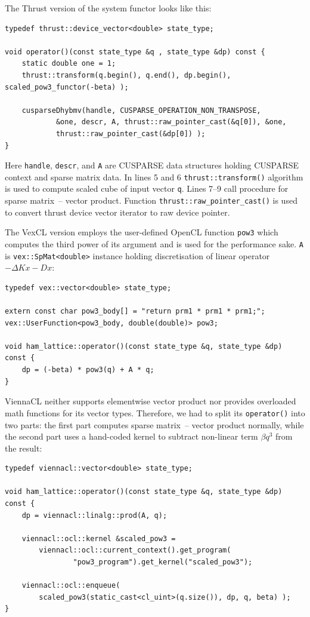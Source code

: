 \documentclass[1p]{elsarticle}
\newcommand{\code}[1]{\lstinline|#1|}
\begin{document}
The Thrust version of the system functor looks like this:
\begin{lstlisting}
typedef thrust::device_vector<double> state_type;

void operator()(const state_type &q , state_type &dp) const {
    static double one = 1;
    thrust::transform(q.begin(), q.end(), dp.begin(), scaled_pow3_functor(-beta) );

    cusparseDhybmv(handle, CUSPARSE_OPERATION_NON_TRANSPOSE,
            &one, descr, A, thrust::raw_pointer_cast(&q[0]), &one,
            thrust::raw_pointer_cast(&dp[0]) );
}
\end{lstlisting}
Here \code{handle}, \code{descr}, and \code{A} are CUSPARSE data structures
holding CUSPARSE context and sparse matrix data. In lines 5 and 6
\code{thrust::transform()} algorithm is used to compute scaled cube of input
vector \code{q}. Lines 7--9 call procedure for sparse matrix~-- vector product.
Function \code{thrust::raw_pointer_cast()} is used to convert thrust device
vector iterator to raw device pointer.

The VexCL version employs the user-defined OpenCL function \code{pow3} which
computes the third power of its argument and is used for the performance sake.
\code{A} is \code{vex::SpMat<double>} instance holding discretisation of linear
operator $-\Delta Kx - Dx$:
\begin{lstlisting}
typedef vex::vector<double> state_type;

extern const char pow3_body[] = "return prm1 * prm1 * prm1;";
vex::UserFunction<pow3_body, double(double)> pow3;

void ham_lattice::operator()(const state_type &q, state_type &dp) const {
    dp = (-beta) * pow3(q) + A * q;
}
\end{lstlisting}

ViennaCL neither supports elementwise vector product nor provides
overloaded math functions for its vector types. Therefore, we had to split its
\code{operator()} into two parts: the first part computes sparse matrix~--
vector product normally, while the second part uses a hand-coded kernel to
subtract non-linear term $\beta q^3$ from the result:
\begin{lstlisting}
typedef viennacl::vector<double> state_type;

void ham_lattice::operator()(const state_type &q, state_type &dp) const {
    dp = viennacl::linalg::prod(A, q);

    viennacl::ocl::kernel &scaled_pow3 =
        viennacl::ocl::current_context().get_program(
                "pow3_program").get_kernel("scaled_pow3");

    viennacl::ocl::enqueue(
        scaled_pow3(static_cast<cl_uint>(q.size()), dp, q, beta) );
}
\end{lstlisting}
\end{document}
